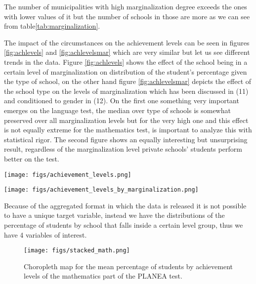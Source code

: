 \documentclass[9pt,twocolumn,twoside,]{pnas-new}
\begin{document}
The number of municipalities with high marginalization degree exceeds
the ones with lower values of it but the number of schools in those are
more as we can see from table\ref{tab:marginalization}.

The impact of the circumstances on the achievement levels can be seen in
figures \ref{fig:achlevels} and \ref{fig:achlevelsmar} which are very
similar but let us see different trends in the data. Figure
\ref{fig:achlevels} shows the effect of the school being in a certain
level of marginalization on distribution of the student's percentage
given the type of school, on the other hand figure
\ref{fig:achlevelsmar} depicts the effect of the school type on the
levels of marginalization which has been discussed in (11) and
conditioned to gender in (12). On the first one something very important
emerges on the language test, the median over type of schools is
somewhat preserved over all marginalization levels but for the very high
one and this effect is not equally extreme for the mathematics test, is
important to analyze this with statistical rigor. The second figure
shows an equally interesting but unsurprising result, regardless of the
marginalization level private schools' students perform better on the
test.

\begin{figure*}
    \centering
    \texttt{[image: figs/achievement\_levels.png]}
    \caption{Distribution of student percentage of a school in each achievement level grouped by marginalization index and school type.}
    \label{fig:achlevels}
\end{figure*}

\begin{figure*}
    \centering
    \texttt{[image: figs/achievement\_levels\_by\_marginalization.png]}
    \caption{Distribution of student percentage of a school in each achievement level grouped by school type and marginalization index.}
    \label{fig:achlevelsmar}
\end{figure*}

Because of the aggregated format in which the data is released it is not
possible to have a unique target variable, instead we have the
distributions of the percentage of students by school that falls inside
a certain level group, thus we have 4 variables of interest.

\begin{figure}[H]
\centering
\texttt{[image: figs/stacked\_math.png]}
\caption{Choropleth map for the mean percentage of students by achievement levels of the mathematics part of the PLANEA test.}
\label{fig:stackedmath}
\end{figure}
\end{document}
